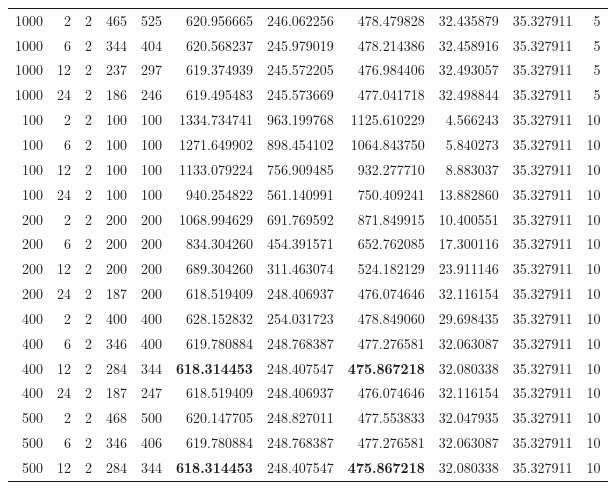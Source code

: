 \begin{table}
\begin{tabular}{rrrrrrrrrrr}
1000 & 2 & 2 & 465 & 525 & 620.956665 & 246.062256 & 478.479828 & 32.435879 & 35.327911 & 5 \\
1000 & 6 & 2 & 344 & 404 & 620.568237 & 245.979019 & 478.214386 & 32.458916 & 35.327911 & 5 \\
1000 & 12 & 2 & 237 & 297 & 619.374939 & 245.572205 & 476.984406 & 32.493057 & 35.327911 & 5 \\
1000 & 24 & 2 & 186 & 246 & 619.495483 & 245.573669 & 477.041718 & 32.498844 & 35.327911 & 5 \\
100 & 2 & 2 & 100 & 100 & 1334.734741 & 963.199768 & 1125.610229 & 4.566243 & 35.327911 & 10 \\
100 & 6 & 2 & 100 & 100 & 1271.649902 & 898.454102 & 1064.843750 & 5.840273 & 35.327911 & 10 \\
100 & 12 & 2 & 100 & 100 & 1133.079224 & 756.909485 & 932.277710 & 8.883037 & 35.327911 & 10 \\
100 & 24 & 2 & 100 & 100 & 940.254822 & 561.140991 & 750.409241 & 13.882860 & 35.327911 & 10 \\
200 & 2 & 2 & 200 & 200 & 1068.994629 & 691.769592 & 871.849915 & 10.400551 & 35.327911 & 10 \\
200 & 6 & 2 & 200 & 200 & 834.304260 & 454.391571 & 652.762085 & 17.300116 & 35.327911 & 10 \\
200 & 12 & 2 & 200 & 200 & 689.304260 & 311.463074 & 524.182129 & 23.911146 & 35.327911 & 10 \\
200 & 24 & 2 & 187 & 200 & 618.519409 & 248.406937 & 476.074646 & 32.116154 & 35.327911 & 10 \\
400 & 2 & 2 & 400 & 400 & 628.152832 & 254.031723 & 478.849060 & 29.698435 & 35.327911 & 10 \\
400 & 6 & 2 & 346 & 400 & 619.780884 & 248.768387 & 477.276581 & 32.063087 & 35.327911 & 10 \\
400 & 12 & 2 & 284 & 344 & \textbf{618.314453} & 248.407547 & \textbf{475.867218} & 32.080338 & 35.327911 & 10 \\
400 & 24 & 2 & 187 & 247 & 618.519409 & 248.406937 & 476.074646 & 32.116154 & 35.327911 & 10 \\
500 & 2 & 2 & 468 & 500 & 620.147705 & 248.827011 & 477.553833 & 32.047935 & 35.327911 & 10 \\
500 & 6 & 2 & 346 & 406 & 619.780884 & 248.768387 & 477.276581 & 32.063087 & 35.327911 & 10 \\
500 & 12 & 2 & 284 & 344 & \textbf{618.314453} & 248.407547 & \textbf{475.867218} & 32.080338 & 35.327911 & 10 \\

\end{tabular}
\end{table}
